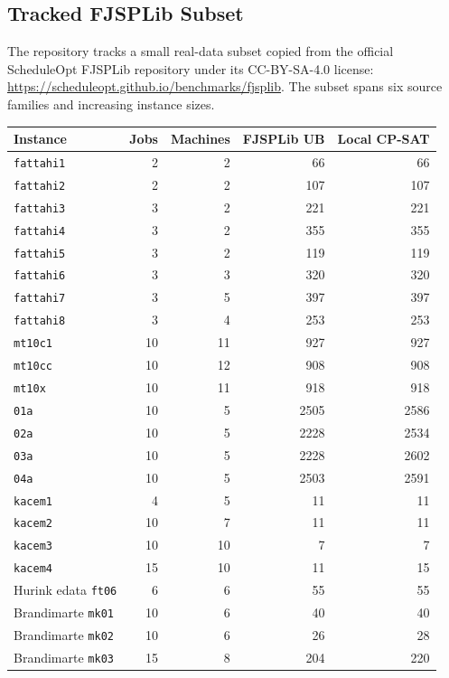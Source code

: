﻿\documentclass[11pt]{article}
\begin{document}
\subsection{Tracked FJSPLib Subset}

The repository tracks a small real-data subset copied from the official
ScheduleOpt FJSPLib repository under its CC-BY-SA-4.0 license:
\url{https://scheduleopt.github.io/benchmarks/fjsplib}.
The subset spans six source families and increasing instance sizes.

\begin{table}[h]
\centering
\begin{tabular}{lrrrr}
\toprule
Instance & Jobs & Machines & FJSPLib UB & Local CP-SAT \\
\midrule
\texttt{fattahi1} & 2 & 2 & 66 & 66 \\
\texttt{fattahi2} & 2 & 2 & 107 & 107 \\
\texttt{fattahi3} & 3 & 2 & 221 & 221 \\
\texttt{fattahi4} & 3 & 2 & 355 & 355 \\
\texttt{fattahi5} & 3 & 2 & 119 & 119 \\
\texttt{fattahi6} & 3 & 3 & 320 & 320 \\
\texttt{fattahi7} & 3 & 5 & 397 & 397 \\
\texttt{fattahi8} & 3 & 4 & 253 & 253 \\
\texttt{mt10c1} & 10 & 11 & 927 & 927 \\
\texttt{mt10cc} & 10 & 12 & 908 & 908 \\
\texttt{mt10x} & 10 & 11 & 918 & 918 \\
\texttt{01a} & 10 & 5 & 2505 & 2586 \\
\texttt{02a} & 10 & 5 & 2228 & 2534 \\
\texttt{03a} & 10 & 5 & 2228 & 2602 \\
\texttt{04a} & 10 & 5 & 2503 & 2591 \\
\texttt{kacem1} & 4 & 5 & 11 & 11 \\
\texttt{kacem2} & 10 & 7 & 11 & 11 \\
\texttt{kacem3} & 10 & 10 & 7 & 7 \\
\texttt{kacem4} & 15 & 10 & 11 & 15 \\
Hurink edata \texttt{ft06} & 6 & 6 & 55 & 55 \\
Brandimarte \texttt{mk01} & 10 & 6 & 40 & 40 \\
Brandimarte \texttt{mk02} & 10 & 6 & 26 & 28 \\
Brandimarte \texttt{mk03} & 15 & 8 & 204 & 220 \\

\end{tabular}
\end{table}
\end{document}
